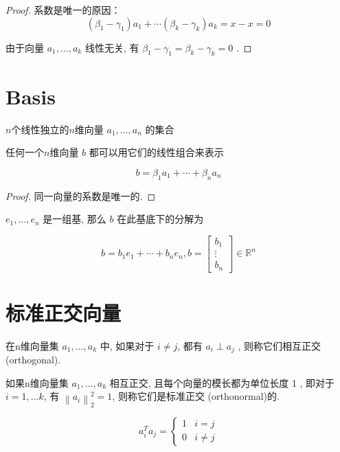 \begin{proof}
    系数是唯一的原因：
$$
\left(\beta_{1}-\gamma_{1}\right) a_{1}+\cdots\left(\beta_{k}-\gamma_{k}\right) a_{k}=x-x=0
$$

由于向量 $ a_{1}, \ldots, a_{k} $ 线性无关, 有 $ \beta_{1}-\gamma_{1}=\beta_{k}-\gamma_{k}=0 $ . 
\end{proof}

\section{Basis}

\begin{definition}[基 (Basis)]
    $n$个线性独立的$n$维向量 $ a_{1}, \ldots, a_{n} $ 的集合
\end{definition}

\begin{definition}
    任何一个$n$维向量 $ b $ 都可以用它们的线性组合来表示

$$
b=\beta_{1} a_{1}+\cdots+\beta_{n} a_{n}
$$
\end{definition}

\begin{proof}
    同一向量的系数是唯一的. 
\end{proof}

\begin{example}
    $ e_{1}, \ldots, e_{n} $ 是一组基, 那么 $ b $ 在此基底下的分解为

    $$ b=b_{1} e_{1}+\cdots+b_{n} e_{n} ,b=\left[\begin{array}{c}b_{1} \\ \vdots \\ b_{n}\end{array}\right] \in \mathbb{R}^{n} $$
\end{example}

\section{标准正交向量}

\begin{definition}
    \label{Def:OrthogonalVectors}
    在n维向量集 $ a_{1}, \ldots, a_{k} $ 中,  如果对于 $ i \neq j $, 都有 $ a_{i} \perp a_{j} $ ,  则称它们相互正交(orthogonal). 
\end{definition}

\begin{definition}
    \label{Def:OrthonormalVectors}
    如果n维向量集 $ a_{1}, \ldots, a_{k} $ 相互正交, 且每个向量的模长都为单位长度 1 ,  即对于 $ i=1, \ldots k $, 有 $ \left\|a_{i}\right\|_{2}^{2}=1 $, 则称它们是标准正交 (orthonormal)的. 

    $$ a_{i}^{T} a_{j}=\left\{\begin{array}{ll}1 & i=j \\ 0 & i \neq j\end{array}\right. $$
\end{definition}

